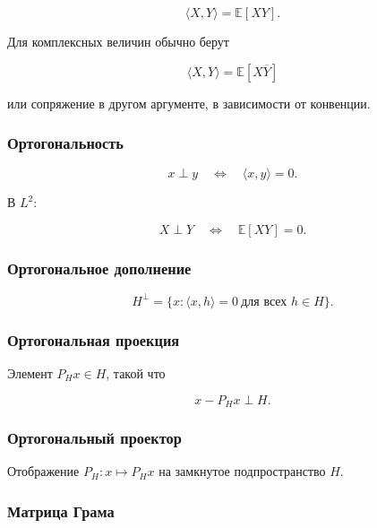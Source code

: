 \documentclass[
  11pt,
  a4paper,
]{article}
\begin{document}
\[
\langle X,Y\rangle=\mathbb E[XY].
\]

Для комплексных величин обычно берут

\[
\langle X,Y\rangle=\mathbb E[X\overline Y]
\]

или сопряжение в другом аргументе, в зависимости от конвенции.

\subsubsection{Ортогональность}\label{ux43eux440ux442ux43eux433ux43eux43dux430ux43bux44cux43dux43eux441ux442ux44c}

\[
x\perp y
\quad\Longleftrightarrow\quad
\langle x,y\rangle=0.
\]

В \(L^2\):

\[
X\perp Y
\quad\Longleftrightarrow\quad
\mathbb E[XY]=0.
\]

\subsubsection{Ортогональное
дополнение}\label{ux43eux440ux442ux43eux433ux43eux43dux430ux43bux44cux43dux43eux435-ux434ux43eux43fux43eux43bux43dux435ux43dux438ux435}

\[
H^\perp=\{x:\langle x,h\rangle=0\ \text{для всех }h\in H\}.
\]

\subsubsection{Ортогональная
проекция}\label{ux43eux440ux442ux43eux433ux43eux43dux430ux43bux44cux43dux430ux44f-ux43fux440ux43eux435ux43aux446ux438ux44f}

Элемент \(P_Hx\in H\), такой что

\[
x-P_Hx\perp H.
\]

\subsubsection{Ортогональный
проектор}\label{ux43eux440ux442ux43eux433ux43eux43dux430ux43bux44cux43dux44bux439-ux43fux440ux43eux435ux43aux442ux43eux440}

Отображение \(P_H:x\mapsto P_Hx\) на замкнутое подпространство \(H\).

\subsubsection{Матрица
Грама}\label{ux43cux430ux442ux440ux438ux446ux430-ux433ux440ux430ux43cux430}
\end{document}
